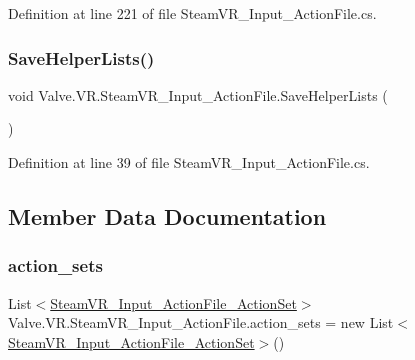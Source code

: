 Definition at line 221 of file Steam\+V\+R\+\_\+\+Input\+\_\+\+Action\+File.\+cs.

\mbox{\label{class_valve_1_1_v_r_1_1_steam_v_r___input___action_file_a4d1383186c22c947fc2330fe3c850f77}} 
\subsubsection{\texorpdfstring{SaveHelperLists()}{SaveHelperLists()}}
{\footnotesize\ttfamily void Valve.\+V\+R.\+Steam\+V\+R\+\_\+\+Input\+\_\+\+Action\+File.\+Save\+Helper\+Lists (\begin{DoxyParamCaption}{ }\end{DoxyParamCaption})}



Definition at line 39 of file Steam\+V\+R\+\_\+\+Input\+\_\+\+Action\+File.\+cs.



\subsection{Member Data Documentation}
\mbox{\label{class_valve_1_1_v_r_1_1_steam_v_r___input___action_file_a4a87ed8dd184895ed7b4117a60dd2589}} 
\subsubsection{\texorpdfstring{action\_sets}{action\_sets}}
{\footnotesize\ttfamily List$<$\mbox{\hyperlink{class_valve_1_1_v_r_1_1_steam_v_r___input___action_file___action_set}{Steam\+V\+R\+\_\+\+Input\+\_\+\+Action\+File\+\_\+\+Action\+Set}}$>$ Valve.\+V\+R.\+Steam\+V\+R\+\_\+\+Input\+\_\+\+Action\+File.\+action\+\_\+sets = new List$<$\mbox{\hyperlink{class_valve_1_1_v_r_1_1_steam_v_r___input___action_file___action_set}{Steam\+V\+R\+\_\+\+Input\+\_\+\+Action\+File\+\_\+\+Action\+Set}}$>$()}



